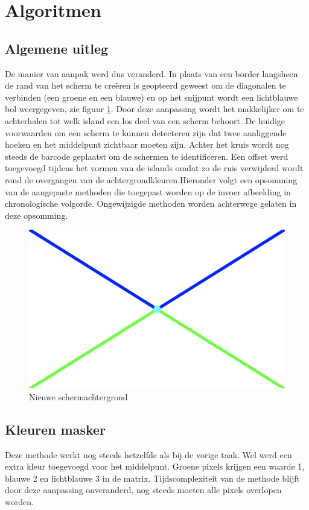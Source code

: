 \section{Algoritmen}
\subsection{Algemene uitleg}
De manier van aanpak werd dus veranderd. In plaats van een border langsheen de rand van het scherm te creëren is geopteerd geweest om de diagonalen te verbinden (een groene en een blauwe) en op het snijpunt wordt een lichtblauwe bol weergegeven, zie figuur \ref{fig:screen}. Door deze aanpassing wordt het makkelijker om te achterhalen tot welk island een los deel van een scherm behoort. De huidige voorwaarden om een scherm te kunnen detecteren zijn dat twee aanliggende hoeken en het middelpunt zichtbaar moeten zijn. Achter het kruis wordt nog steeds de barcode geplaatst om de schermen te identificeren.
Een offset werd toegevoegd tijdens het vormen van de islands omdat zo de ruis verwijderd wordt rond de overgangen van de achtergrondkleuren.Hieronder volgt een opsomming van de aangepaste methoden die toegepast worden op de invoer afbeelding in chronologische volgorde. Ongewijzigde methoden worden achterwege gelaten in deze opsomming.

\begin{figure} [h]
	\center
	\includegraphics[width=\textwidth]{screen}
	\caption{Nieuwe schermachtergrond}
	\label{fig:screen}
\end{figure}

\subsection{Kleuren masker}
Deze methode werkt nog steeds hetzelfde als bij de vorige taak. Wel werd een extra kleur toegevoegd voor het middelpunt. Groene pixels krijgen een waarde 1, blauwe 2 en lichtblauwe 3 in de matrix. Tijdscomplexiteit van de methode blijft door deze aanpassing onveranderd, nog steeds moeten alle pixels overlopen worden.

